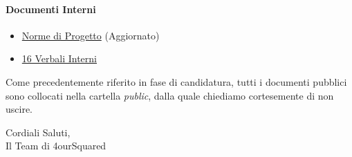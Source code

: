 \documentclass[12pt, a4paper]{article}
\begin{document}
\paragraph{Documenti Interni}
\begin{itemize}
    \item \href{https://github.com/4ourSquared/LumosMinima/tree/main/public/interni/norme_di_progetto.pdf}{Norme di Progetto} (Aggiornato)
    \item \href{https://github.com/4ourSquared/LumosMinima/tree/main/public/interni/verbali}{16 Verbali Interni}
\end{itemize}

Come precedentemente riferito in fase di candidatura, tutti i documenti pubblici sono collocati nella cartella \textit{public}, dalla quale chiediamo cortesemente di non uscire.

\begin{flushright}
    Cordiali Saluti,\\
    Il Team di 4ourSquared
    \end{flushright}
\end{document}
